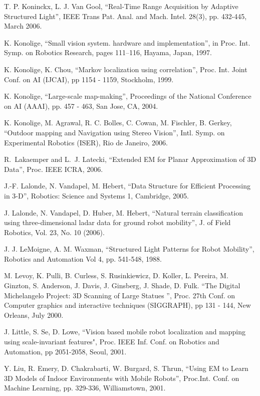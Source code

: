 \documentclass[twocolumn,oneside]{book}
\begin{document}
\begin{thebibliography}{99}
T. P. Koninckx, L. J. Van Gool,
``Real-Time Range Acquisition by Adaptive Structured Light'',
IEEE Trans Pat. Anal. and Mach. Intel. 28(3), pp. 432-445, March 2006. 

K. Konolige,
``Small vision system. hardware and implementation'',
in Proc. Int. Symp. on Robotics Research, pages 111--116,
Hayama, Japan, 1997.

K. Konolige, K. Chou,
``Markov localization using correlation'',
Proc. Int. Joint Conf. on AI (IJCAI), pp 1154 - 1159, Stockholm, 1999.

K. Konolige,
``Large-scale map-making'',
Proceedings of the National Conference on AI (AAAI), pp. 457 - 463, San Jose, CA, 2004.

K. Konolige, M. Agrawal, R. C. Bolles, C. Cowan, M. Fischler, B. Gerkey,
``Outdoor mapping and Navigation using Stereo Vision'',
Intl. Symp. on Experimental Robotics (ISER), Rio de Janeiro, 2006.

R.~Lakaemper and L.~J. Latecki,
``Extended EM for Planar Approximation of 3D Data'',
Proc. IEEE ICRA, 2006.

J.-F. Lalonde, N. Vandapel, M. Hebert,
``Data Structure for Efficient Processing in 3-D'',
Robotics: Science and Systems 1, Cambridge, 2005.

J. Lalonde, N. Vandapel, D. Huber, M. Hebert,
``Natural terrain classification using three-dimensional ladar data
for ground robot mobility'',
J. of Field Robotics, Vol. 23, No. 10 (2006).

J. J. LeMoigne, A. M. Waxman, 
``Structured Light Patterns for Robot Mobility'',
Robotics and Automation Vol 4, pp. 541-548, 1988.

M. Levoy, K. Pulli, B. Curless, S. Rusinkiewicz, D. Koller, L. Pereira, M. Ginzton, S. Anderson, J. Davis, J. Ginsberg, J. Shade, D. Fulk.
``The Digital Michelangelo Project: 3D Scanning of Large Statues '',
Proc. 27th Conf. on Computer graphics and interactive techniques
(SIGGRAPH), pp 131 - 144, New Orleans, July 2000.

J. Little, S. Se, D. Lowe,
``Vision based mobile robot localization and mapping using scale-invariant features",
Proc. IEEE Inf. Conf. on Robotics and Automation, pp 2051-2058, Seoul, 2001.

Y. Liu, R. Emery, D. Chakrabarti, W. Burgard, S. Thrun, 
``Using EM to Learn 3D Models of Indoor Environments with Mobile
Robots'', 
Proc.Int. Conf. on Machine Learning, pp. 329-336, Williamstown, 2001.


\end{thebibliography}
\end{document}
